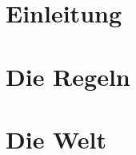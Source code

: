 

\title{}
\author{%
      Autor: Marco Behnke\\
      Seitenumfang: \ref{TotPages}\\
      }


        \sffamily
        \frontmatter
                \begin{titlepage}
                	\maketitle
                \end{titlepage}
                \setcounter{section}{-1}
                

                \tableofcontents
                \newpage
        \mainmatter
                \part{Einleitung}
                        
                        
                        \newpage
                \part{Die Regeln}
                        
                        
                        
                        
                        \newpage
                \part{Die Welt}
                        
                        
                        
                        
                        
                        
                        
                        
        \backmatter
                \appendix
